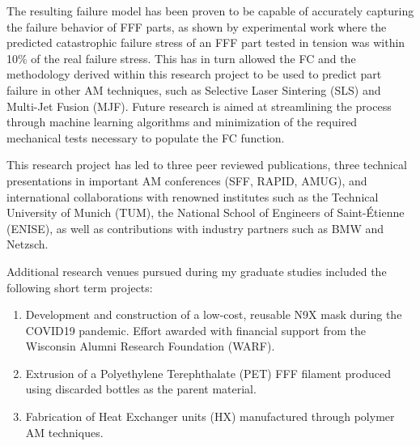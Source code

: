 \documentclass[11pt,letterpaper]{article}
\begin{document}
The resulting failure model has been proven to be capable of accurately capturing the failure behavior of FFF parts, as shown by experimental work where the predicted catastrophic failure stress of an FFF part tested in tension was within 10\% of the real failure stress. This has in turn allowed the FC and the methodology derived within this research project to be used to predict part failure in other AM techniques, such as Selective Laser Sintering (SLS) and Multi-Jet Fusion (MJF). Future research is aimed at streamlining the process through machine learning algorithms and minimization of the required mechanical tests necessary to populate the FC function.


This research project has led to three peer reviewed publications, three technical presentations in important AM conferences (SFF, RAPID, AMUG), and international collaborations with renowned institutes such as the Technical University of Munich (TUM), the National School of Engineers of Saint-\'Etienne (ENISE), as well as contributions with industry partners such as BMW and Netzsch.


Additional research venues pursued during my graduate studies included the following short term projects:
\begin{enumerate}
	\item Development and construction of a low-cost, reusable N9X mask during the COVID19 pandemic. Effort awarded with financial support from the Wisconsin Alumni Research Foundation (WARF).
	\item Extrusion of a Polyethylene Terephthalate (PET) FFF filament produced using discarded bottles as the parent material.
	\item Fabrication of Heat Exchanger units (HX) manufactured through polymer AM techniques.
\end{enumerate}
\end{document}
